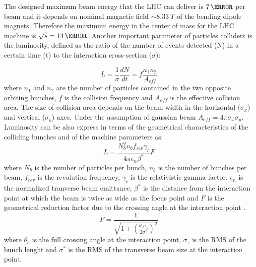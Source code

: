 The designed maximum beam energy that the LHC can deliver is $7\,\TeV$ per beam and it depends on nominal magnetic field $\sim8.33~T$ of the bending dipole magnets. Therefore the maximum energy in the center of mass for the LHC machine is $\sqrt{s} = 14\,\TeV$.
Another important parameter of particles colliders is the luminosity, defined as the ratio of the number of events detected (N) in a certain time (t) to the interaction cross-section ($\sigma$):

\begin{equation}
L = \frac{1}{\sigma}\frac{dN}{dt} = f \frac{n_1 n_2}{A_{eff}}
\end{equation}
where $n_1$ and $n_2$ are the number of particles contained in the two opposite orbiting bunches, $f$ is the collision frequency and $A_{eff}$ is the effective collision area. The size of collision area depends on the beam width in the horizontal ($\sigma_x$) and vertical ($\sigma_y$) axes. Under the assumption of gaussian beam $A_{eff} = 4\pi \sigma_x \sigma_y$.
Luminosity can be also express in terms of the geometrical characteristics of the colliding bunches and of the machine parameters as:
\begin{equation}
L = \frac{N^2_b n_b f_{rev} \gamma_r}{4\pi \epsilon_n \beta^*}F
\end{equation}
where $N_b$ is the number of particles per bunch, $n_b$ is the number of bunches per beam, $f_{rev}$ is the revolution frequency, $\gamma_r$ is the relativistic gamma factor, $\epsilon_n$ is the normalized tranverse beam emittance, $\beta^*$ is the distance from the interaction point at which the beam is twice as wide as the focus point and $F$ is the geometrical reduction factor due to the crossing angle at the interaction point .
\begin{equation}
F = \frac{1}{\sqrt{1 + ( \frac{\theta_c \sigma_z}{2\sigma^*} )^2}}
\end{equation}
where $\theta_c$ is the full crossing angle at the interaction point, $\sigma_z$ is the RMS of the bunch lenght and $\sigma^*$ is the RMS of the transverse beam size at the interaction point.
